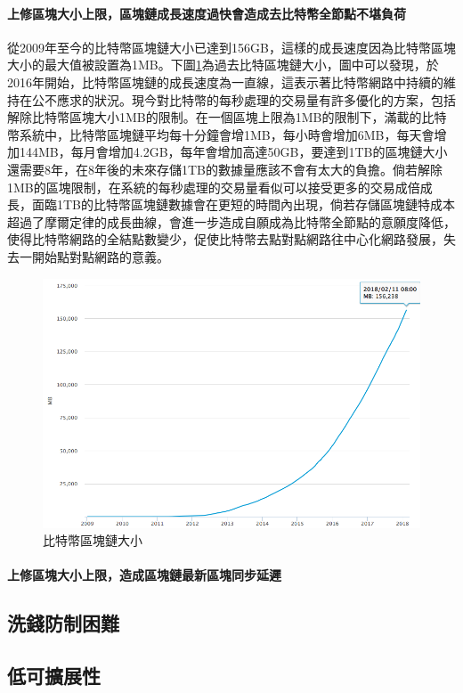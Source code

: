 			\paragraph{上修區塊大小上限，區塊鏈成長速度過快會造成去比特幣全節點不堪負荷}
			從2009年至今的比特幣區塊鏈大小已達到156GB，這樣的成長速度因為比特幣區塊大小的最大值被設置為1MB。下圖\ref{blockchainsize}為過去比特區塊鏈大小，圖中可以發現，於2016年開始，比特幣區塊鏈的成長速度為一直線，這表示著比特幣網路中持續的維持在公不應求的狀況。現今對比特幣的每秒處理的交易量有許多優化的方案，包括解除比特幣區塊大小1MB的限制。在一個區塊上限為1MB的限制下，滿載的比特幣系統中，比特幣區塊鏈平均每十分鐘會增1MB，每小時會增加6MB，每天會增加144MB，每月會增加4.2GB，每年會增加高達50GB，要達到1TB的區塊鏈大小還需要8年，在8年後的未來存儲1TB的數據量應該不會有太大的負擔。倘若解除1MB的區塊限制，在系統的每秒處理的交易量看似可以接受更多的交易成倍成長，面臨1TB的比特幣區塊鏈數據會在更短的時間內出現，倘若存儲區塊鏈特成本超過了摩爾定律的成長曲線，會進一步造成自願成為比特幣全節點的意願度降低，使得比特幣網路的全結點數變少，促使比特幣去點對點網路往中心化網路發展，失去一開始點對點網路的意義。

			\begin{figure}[h]
				\centering
				\includegraphics[width = .7\textwidth]{blockchainsize.png}
				\caption{比特幣區塊鏈大小\parencite{blockchainsize}}\label{blockchainsize}
			\end{figure}

			\paragraph{上修區塊大小上限，造成區塊鏈最新區塊同步延遲}

		

		\subsection{洗錢防制困難}
		\subsection{低可擴展性}


